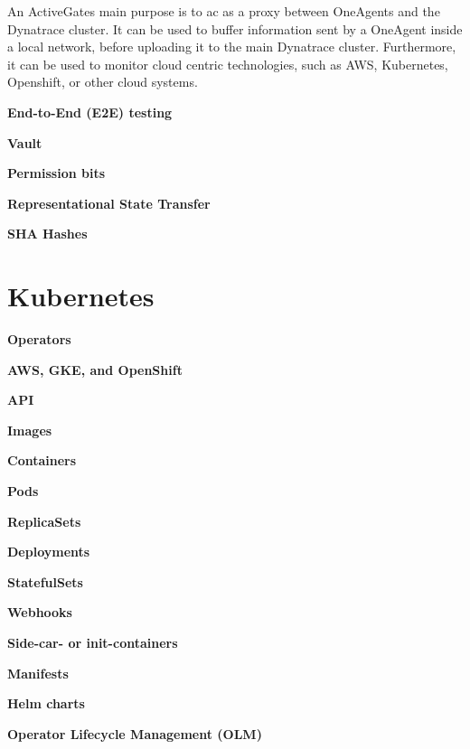 An ActiveGates\cite{activegates} main purpose is to ac as a proxy between OneAgents and the Dynatrace cluster.
It can be used to buffer information sent by a OneAgent inside a local network, before uploading it to the main Dynatrace cluster.
Furthermore, it can be used to monitor cloud centric technologies, such as AWS, Kubernetes, Openshift, or other cloud systems.

\textbf{End-to-End (E2E) testing}

\textbf{Vault}

\textbf{Permission bits}

\textbf{Representational State Transfer}

\textbf{SHA Hashes}

\section{Kubernetes}\label{sec:kubernetes}

\textbf{Operators}

\textbf{AWS, GKE, and OpenShift}

\textbf{API}

\textbf{Images}

\textbf{Containers}

\textbf{Pods}

\textbf{ReplicaSets}

\textbf{Deployments}

\textbf{StatefulSets}

\textbf{Webhooks}

\textbf{Side-car- or init-containers}

\textbf{Manifests}

\textbf{Helm charts}

\textbf{Operator Lifecycle Management (OLM)}